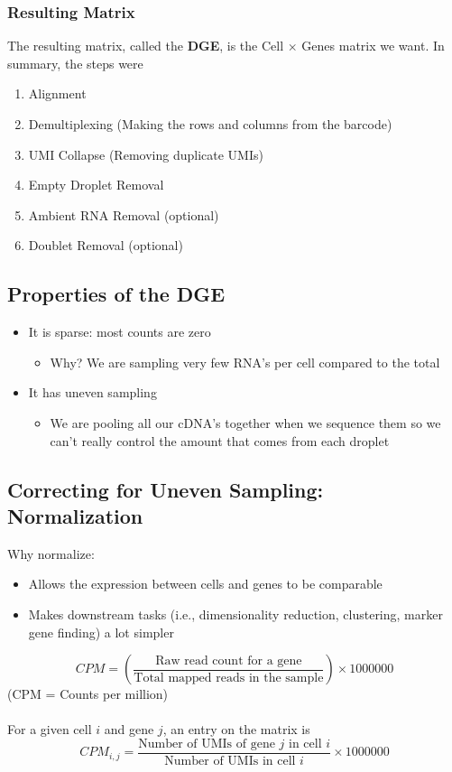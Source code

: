 \documentclass[10pt]{article}
\begin{document}
\subsubsection*{Resulting Matrix}
The resulting matrix, called the \textbf{DGE}, is the Cell $\times$ Genes matrix we want.  In summary, the steps were
\begin{enumerate}
	\item Alignment
	\item Demultiplexing (Making the rows and columns from the barcode)
	\item UMI Collapse (Removing duplicate UMIs)
	\item Empty Droplet Removal
	\item Ambient RNA Removal (optional)
	\item Doublet Removal (optional)
\end{enumerate}

\subsection*{Properties of the DGE}
\begin{itemize}
	\item It is sparse: most counts are zero
	\begin{itemize}
	    \item Why?  We are sampling very few RNA's per cell compared to the total
    \end{itemize}
	\item It has uneven sampling
	\begin{itemize}
	    \item We are pooling all our cDNA's together when we sequence them so we can't really control the amount that comes from each droplet
    \end{itemize}
\end{itemize}

\subsection*{Correcting for Uneven Sampling: Normalization}
Why normalize:
\begin{itemize}
	\item Allows the expression between cells and genes to be comparable
	\item Makes downstream tasks (i.e., dimensionality reduction, clustering, marker gene finding) a lot simpler
\end{itemize}
\[CPM = \left(\frac{\text{Raw read count for a gene}}{\text{Total mapped reads in the sample}}\right) \times 1000000\]
(CPM = Counts per million)\\\\
For a given cell $i$ and gene $j$, an entry on the matrix is
\[CPM_{i, j} = \frac{\text{Number of UMIs of gene $j$ in cell $i$}}{\text{Number of UMIs in cell $i$}} \times 1000000\]
\end{document}
